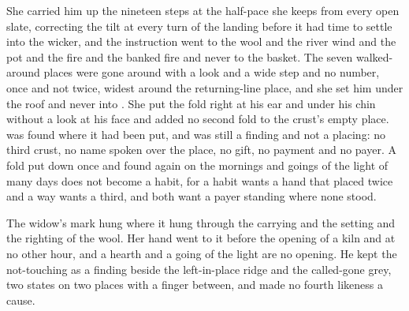 She carried him up the nineteen steps at the half-pace she keeps from every open slate, correcting the tilt at every turn of the landing before it had time to settle into the wicker, and the instruction went to the wool and the river wind and the pot and the fire and the banked fire and never to the basket. The seven walked-around places were gone around with a look and a wide step and no number, once and not twice, widest around the returning-line place, and she set him under the roof and never into . She put the fold right at his ear and under his chin without a look at his face and added no second fold to the crust's empty place.  was found where it had been put, and was still a finding and not a placing: no third crust, no name spoken over the place, no gift, no payment and no payer. A fold put down once and found again on the mornings and goings of the light of many days does not become a habit, for a habit wants a hand that placed twice and a way wants a third, and both want a payer standing where none stood.

The widow's mark hung where it hung through the carrying and the setting and the righting of the wool. Her hand went to it before the opening of a kiln and at no other hour, and a hearth and a going of the light are no opening. He kept the not-touching as a finding beside the left-in-place ridge and the called-gone grey, two states on two places with a finger between, and made no fourth likeness a cause.

